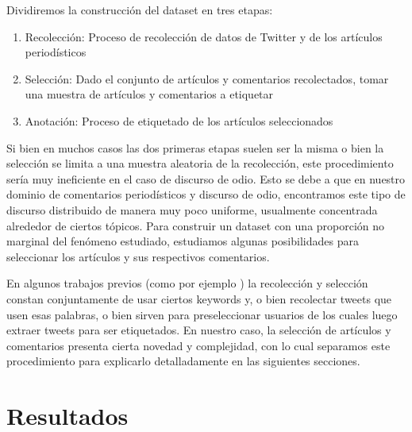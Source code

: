 Dividiremos la construcción del dataset en tres etapas:

\begin{enumerate}
    \item Recolección: Proceso de recolección de datos de Twitter y de los artículos periodísticos
    \item Selección: Dado el conjunto de artículos y comentarios recolectados, tomar una muestra de artículos y comentarios a etiquetar
    \item Anotación: Proceso de etiquetado de los artículos seleccionados
\end{enumerate}

Si bien en muchos casos las dos primeras etapas suelen ser la misma o bien la selección se limita a una muestra aleatoria de la recolección, este procedimiento sería muy ineficiente en el caso de discurso de odio. Esto se debe a que en nuestro dominio de comentarios periodísticos y discurso de odio, encontramos este tipo de discurso distribuido de manera muy poco uniforme, usualmente concentrada alrededor de ciertos tópicos. Para construir un dataset con una proporción no marginal del fenómeno estudiado, estudiamos algunas posibilidades para seleccionar los artículos y sus respectivos comentarios.

En algunos trabajos previos (como por ejemplo \citet{waseem2016hateful,hateval2019semeval}) la recolección y selección constan conjuntamente de usar ciertos keywords y, o bien recolectar tweets que usen esas palabras, o bien sirven para preseleccionar usuarios de los cuales luego extraer tweets para ser etiquetados. En nuestro caso, la selección de artículos y comentarios presenta cierta novedad y complejidad, con lo cual separamos este procedimiento para explicarlo detalladamente en las siguientes secciones.





\section{Resultados}

